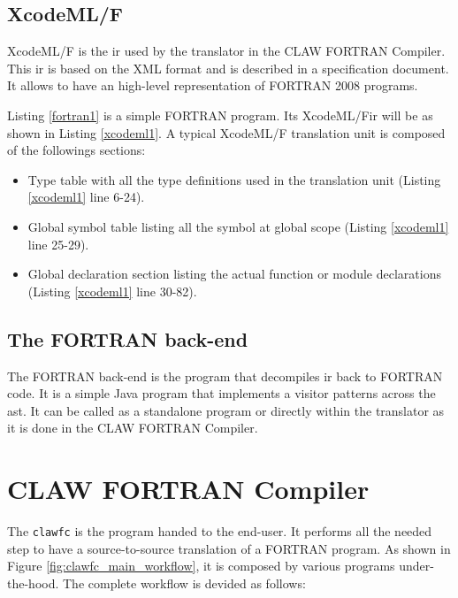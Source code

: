 \documentclass[a4paper, 11pt]{report}
\def\clawfcomp{CLAW FORTRAN Compiler\xspace}
\def\xcodeml{XcodeML/F\xspace}
\def\clawfc{\lstinline!clawfc!\xspace}
\begin{document}

\subsection{\xcodeml}
\xcodeml\cite{omni:xcodemlf95,omni:xcodemlf2008} is the \gls{ir} used by the translator in the CLAW FORTRAN Compiler. This \gls{ir} is based on the XML format and is described in a specification document. It allows to have an high-level representation of FORTRAN 2008 programs.

Listing \ref{fortran1} is a simple FORTRAN program. Its \xcodeml \gls{ir} will be as shown in Listing \ref{xcodeml1}. A typical \xcodeml translation unit is composed of the followings sections: 
\begin{itemize}
\item Type table with all the type definitions used in the translation unit (Listing \ref{xcodeml1} line 6-24).
\item Global symbol table listing all the symbol at global scope (Listing \ref{xcodeml1} line 25-29).
\item Global declaration section listing the actual function or module declarations (Listing \ref{xcodeml1} line 30-82).
\end{itemize}





\subsection{The FORTRAN back-end}
The FORTRAN back-end is the program that decompiles \gls{ir} back to FORTRAN code. It is a simple Java program that implements a visitor patterns across the \gls{ast}. It can be called as a standalone program or directly within the translator as it is done in the \clawfcomp.

\section{\clawfcomp}

The \clawfc is the program handed to the end-user. It performs all the needed step to have a source-to-source translation of a FORTRAN program. As shown in Figure \ref{fig:clawfc_main_workflow}, it is composed by various programs under-the-hood. The complete workflow is devided as follows: 
\end{document}
